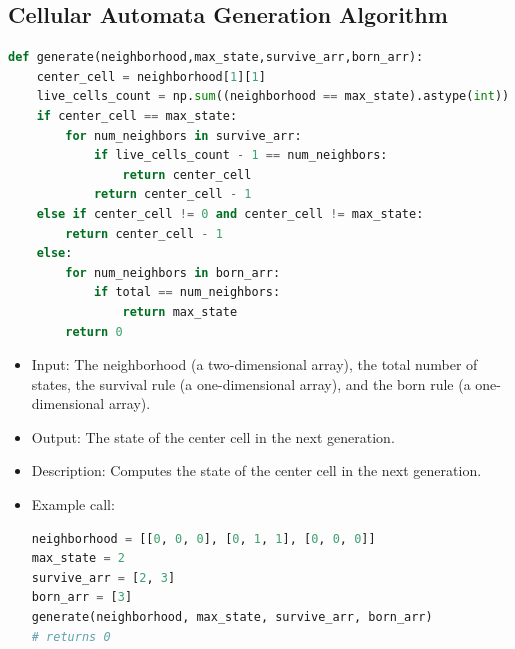 \documentclass[12pt]{article}
\numberwithin{figure}{section} %
\begin{document}
\subsection{Cellular Automata Generation Algorithm}
\label{subsection:Cellular Automata Generation Algorithm}
\begin{lstlisting}[language=Python]
def generate(neighborhood,max_state,survive_arr,born_arr):
    center_cell = neighborhood[1][1]
    live_cells_count = np.sum((neighborhood == max_state).astype(int))
    if center_cell == max_state: 
        for num_neighbors in survive_arr:
            if live_cells_count - 1 == num_neighbors: 
                return center_cell 
            return center_cell - 1
    else if center_cell != 0 and center_cell != max_state:
        return center_cell - 1
    else:
        for num_neighbors in born_arr: 
            if total == num_neighbors:
                return max_state 
        return 0
\end{lstlisting}
\vspace{-1.5em}
\begin{itemize}[leftmargin = 0.5cm, topsep=0pt,itemsep=-1ex,partopsep=1ex,parsep=1ex]
\item Input: The neighborhood (a two-dimensional array), the total number of states, the survival rule (a one-dimensional array), and the born rule (a one-dimensional array). 
\item Output: The state of the center cell in the next generation.  
\item Description: Computes the state of the center cell in the next generation. 
\item Example call: 
\begin{lstlisting}[language = Python]
neighborhood = [[0, 0, 0], [0, 1, 1], [0, 0, 0]]
max_state = 2
survive_arr = [2, 3]
born_arr = [3]
generate(neighborhood, max_state, survive_arr, born_arr) 
# returns 0
\end{lstlisting}
\end{itemize}
\end{document}
